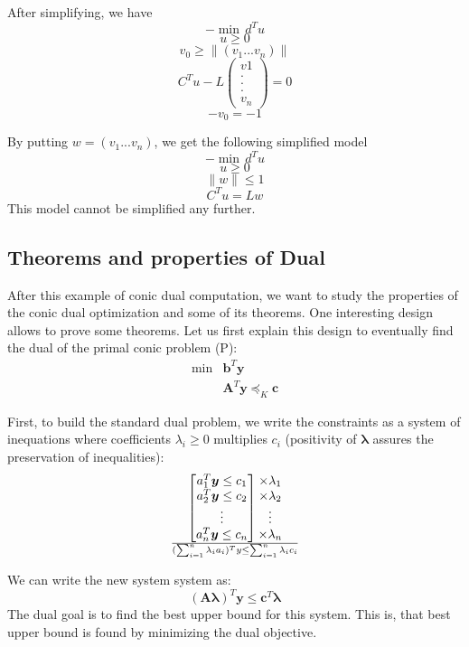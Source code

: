  After simplifying, we have \\
 $$-\min \, d^Tu$$
 $$u \geq 0$$
 $$v_0 \geq \parallel (v_1 ... v_n) \parallel$$
 $$C^Tu - L\begin{pmatrix}
 v1\\ 
 .\\
 .\\
 .\\
 v_n
 \end{pmatrix} = 0 $$
 $$-v_0=-1$$
 
 By putting $w=(v_1 ... v_n)$, we get the following simplified model 
$$-\min \, d^Tu$$
$$u \geq 0$$
$$\parallel w \parallel \leq 1$$
$$C^Tu = Lw$$
This model cannot be simplified any further.


\subsection{Theorems and properties of Dual}
After this example of conic dual computation, we want to study the properties of the conic dual optimization and some of its theorems. One interesting design allows to prove some theorems. Let us first explain this design to eventually find the dual of the primal conic problem (P):
\begin{align*}
\min&\textbf{b}^T\textbf{y}\\
             &\textbf{A}^T\textbf{y}\preceq_K \textbf{c}
\end{align*}

First, to build the standard dual problem, we write the constraints as a system of inequations where coefficients $\lambda_i \geq 0$ multiplies $c_i$ (positivity of $\boldsymbol{\lambda}$ assures the preservation of inequalities):
\[\begin{bmatrix}
 a_1^T \boldsymbol{y} \leq c_1\\
 a_2^T \boldsymbol{y} \leq c_2\\
 \vdots\\
 a_n^T \boldsymbol{y} \leq c_n
\end{bmatrix}
\begin{matrix}
 \times \lambda_1\\
 \times \lambda_2\\
 \vdots\\
 \times \lambda_n
\end{matrix}
\over
(\sum_{i=1}^{n}\lambda_i a_i)^Ty \leq \sum_{i=1}^{n}\lambda_i c_i\]

We can write the new system system as:
\[(\boldsymbol{A}\boldsymbol{\lambda})^T \boldsymbol{y} \leq \boldsymbol{c}^T \boldsymbol{\lambda}
\]
The dual goal is to find the best upper bound for this system. This is, that best upper bound is found by minimizing the dual objective.\\

